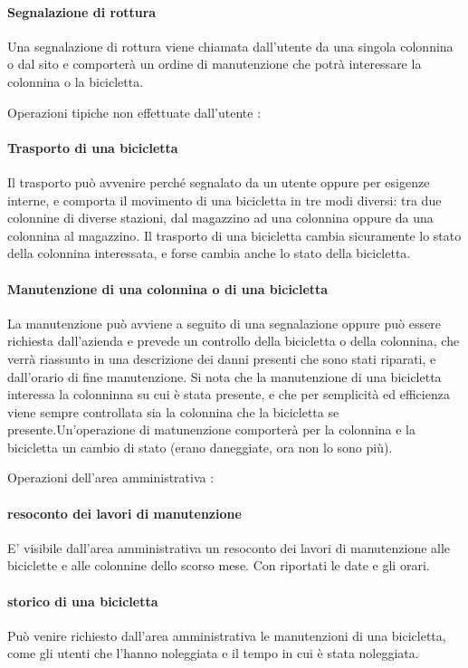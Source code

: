 \documentclass[a4paper,twoside]{article}
\begin{document}
\paragraph{Segnalazione di rottura} Una segnalazione di rottura viene chiamata dall'utente da una singola colonnina o dal sito e comporterà un ordine di manutenzione che potrà interessare la colonnina o la bicicletta.
\par Operazioni tipiche non effettuate dall'utente :
\paragraph{Trasporto di una bicicletta} Il trasporto può avvenire perché segnalato da un utente oppure per esigenze interne, e comporta il movimento di una bicicletta in tre modi diversi: tra due colonnine di diverse stazioni, dal magazzino ad una colonnina oppure da una colonnina al magazzino. Il trasporto di una bicicletta cambia sicuramente lo stato della colonnina interessata, e forse cambia anche lo stato della bicicletta.
\paragraph{Manutenzione di una colonnina o di una bicicletta} La manutenzione può avviene a seguito di una segnalazione oppure può essere richiesta dall'azienda e prevede un controllo della bicicletta o della colonnina, che verrà riassunto in una descrizione dei danni presenti che sono stati riparati, e dall'orario di fine manutenzione. Si nota che la manutenzione di una bicicletta interessa la colonninna su cui è stata presente, e che per semplicità ed efficienza viene sempre controllata sia la colonnina che la bicicletta se presente.Un'operazione di matunenzione comporterà per la colonnina e la bicicletta un cambio di stato (erano daneggiate, ora non lo sono più).\newline
\par Operazioni dell'area amministrativa :
\paragraph{resoconto dei lavori di manutenzione} E' visibile dall'area amministrativa un resoconto dei lavori di manutenzione alle biciclette e alle colonnine dello scorso mese. Con riportati le date e gli orari.
\paragraph{storico di una bicicletta} Può venire richiesto dall'area amministrativa le manutenzioni di una bicicletta, come gli utenti che l'hanno noleggiata e il tempo in cui è stata noleggiata.
\end{document}

